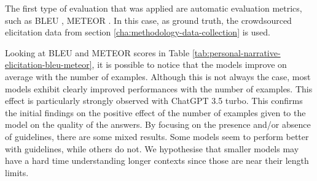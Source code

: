 % 
The first type of evaluation that was applied are automatic evaluation metrics, such as BLEU \cite{bleu}, METEOR \cite{meteor}. In this case, as ground truth, the crowdsourced elicitation data from section \ref{cha:methodology-data-collection} is used.


% 
% 
% 

Looking at BLEU and METEOR scores in Table \ref{tab:personal-narrative-elicitation-bleu-meteor}, it is possible to notice that the models improve on average with the number of examples. Although this is not always the case, most models exhibit clearly improved performances with the number of examples. This effect is particularly strongly observed with ChatGPT 3.5 turbo. This confirms the initial findings on the positive effect of the number of examples given to the model on the quality of the answers.
By focusing on the presence and/or absence of guidelines, there are some mixed results. Some models seem to perform better with guidelines, while others do not. We hypothesise that smaller models may have a hard time understanding longer contexts since those are near their length limits. 

